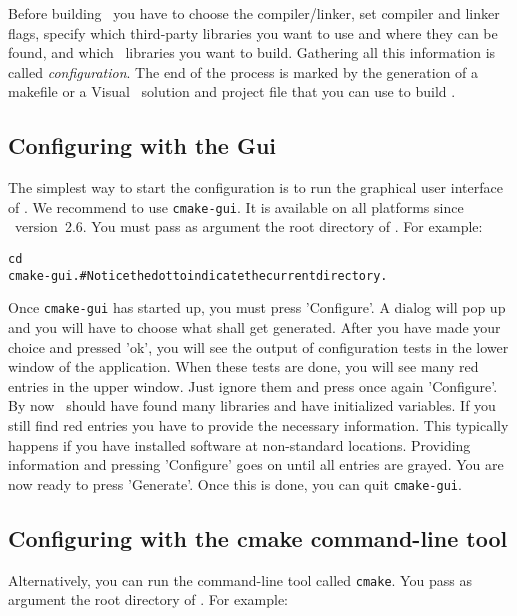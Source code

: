 Before building \cgal\ you have to choose the compiler/linker, 
set compiler and linker flags, specify which
third-party libraries you want to use and where they can be found, and 
which \cgal\ libraries you want to build. Gathering
all this information is called {\em configuration}. 
The end of the process is marked by the generation of a makefile or a Visual \CC\
solution and project file that you can use to build \cgal.

\subsection{Configuring \cgal{} with the \cmake{} {\sc Gui} }

The simplest way to start the configuration is to run the graphical
user interface of \cmake. We recommend to use \texttt{cmake-gui}. It
is available on all platforms since \cmake\ version~2.6. You must pass as 
argument the root directory of \cgal. For example:

{\ccTexHtml{\scriptsize}{}
\begin{alltt}
  cd  \cgalrel
  cmake-gui . # Notice the dot to indicate the current directory.
\end{alltt}
}

Once \texttt{cmake-gui} has started up, you must press 'Configure'. 
A dialog will pop up and you will have to choose what shall get generated.
After you have made your choice and pressed 'ok', you will see
the output of configuration tests in the lower window of the application. 
When these tests are done, you will see many
red entries in the upper window. Just ignore them and  press once again  'Configure'. 
By now \cmake\ should have found many libraries and have initialized variables. 
If you still find red entries you have to provide the necessary information. 
This typically happens if you have installed software at non-standard locations.
Providing information and pressing 'Configure' goes on until 
all entries are grayed. You are now ready to press 'Generate'. Once this is
done, you can quit \texttt{cmake-gui}.

\subsection{Configuring \cgal{} with the cmake command-line tool }

Alternatively, you can run the command-line tool called
\texttt{cmake}. You pass as argument the root directory of
\cgal. For example:


